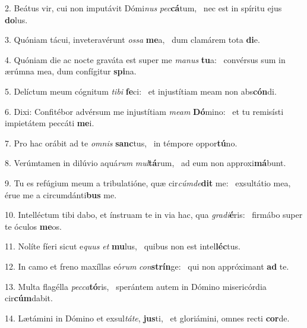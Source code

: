 2. Beátus vir, cui non imputávit Dómi\textit{nus} \textit{pec}\textbf{cá}tum, \ast\  nec est in spíritu ejus \textbf{do}lus.\

3. Quóniam tácui, inveteravérunt \textit{os}\textit{sa} \textbf{me}a, \ast\  dum clamárem tota \textbf{di}e.\

4. Quóniam die ac nocte graváta est super me \textit{ma}\textit{nus} \textbf{tu}a: \ast\  convérsus sum in ærúmna mea, dum confígitur \textbf{spi}na.\

5. Delíctum meum cógnitum \textit{ti}\textit{bi} \textbf{fe}ci: \ast\  et injustítiam meam non abs\textbf{cón}di.\

6. Dixi: Confitébor advérsum me injustítiam \textit{me}\textit{am} \textbf{Dó}mino: \ast\  et tu remisísti impietátem peccáti \textbf{me}i.\

7. Pro hac orábit ad te \textit{om}\textit{nis} \textbf{sanc}tus, \ast\  in témpore oppor\textbf{tú}no.\

8. Verúmtamen in dilúvio aquá\textit{rum} \textit{mul}\textbf{tá}rum, \ast\  ad eum non approxi\textbf{má}bunt.\

9. Tu es refúgium meum a tribulatióne, quæ cir\textit{cúm}\textit{de}\textbf{dit} me: \ast\  exsultátio mea, érue me a circumdánti\textbf{bus} me.\

10. Intelléctum tibi dabo, et ínstruam te in via hac, qua \textit{gra}\textit{di}\textbf{é}ris: \ast\  firmábo super te óculos \textbf{me}os.\

11. Nolíte fíeri sicut e\textit{quus} \textit{et} \textbf{mu}lus, \ast\  quibus non est intel\textbf{léc}tus.\

12. In camo et freno maxíllas eó\textit{rum} \textit{con}\textbf{strín}ge: \ast\  qui non appróximant \textbf{ad} te.\

13. Multa flagélla \textit{pec}\textit{ca}\textbf{tó}ris, \ast\  sperántem autem in Dómino misericórdia cir\textbf{cúm}dabit.\

14. Lætámini in Dómino et exsul\textit{tá}\textit{te}, \textbf{jus}ti, \ast\  et gloriámini, omnes recti \textbf{cor}de.\

